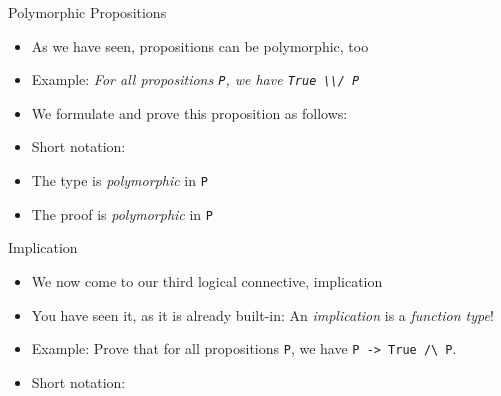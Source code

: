 \begin{frame}[fragile]{Polymorphic Propositions}
\begin{itemize}
  \item As we have seen, propositions can be polymorphic, too
  \item Example: \textit{For all propositions \lstinline|P|, we have \lstinline|True \\/ P|}

  \pause

  \item We formulate and prove this proposition as follows:


  \pause

  \item Short notation:


  \pause

  \item The type is \textit{polymorphic} in \lstinline|P|

  \pause

  \item The proof is \textit{polymorphic} in \lstinline|P|
\end{itemize}
\end{frame}

\begin{frame}[fragile]{Implication}
\begin{itemize}
  \item We now come to our third logical connective, implication

  \pause

  \item You have seen it, as it is already built-in: An \textit{implication} is a \textit{function type}!

  \pause

  \item Example: Prove that for all propositions \lstinline|P|, we have \lstinline|P -> True /\|~\lstinline|P|.


  \pause

  \item Short notation:

\end{itemize}
\end{frame}


